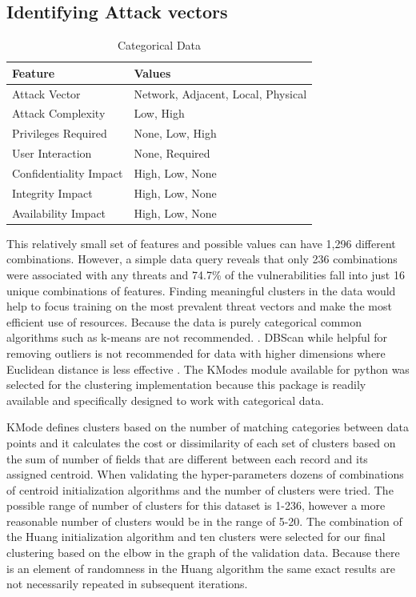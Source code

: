 \documentclass{article} %
\begin{document}
\subsection{Identifying Attack vectors}
\begin{table}[h!]
\begin{center}
\begin{tabular}{ |l|l| } \hline
Feature & Values\\\hline
Attack Vector & Network, Adjacent, Local, Physical  \\ 
Attack Complexity & Low, High  \\ 
Privileges Required & None, Low, High  \\ 
User Interaction & None, Required  \\ 
Confidentiality Impact & High, Low, None\\
Integrity Impact & High, Low, None\\
Availability Impact & High, Low, None\\
\hline
\end{tabular}
\end{center}
\caption{Categorical Data} 
\label{table:1}
\end{table} 

This relatively small set of features and possible values can have 1,296 different combinations.  However, a simple data query reveals that only 236 combinations were associated with any threats and 74.7\% of the vulnerabilities fall into just 16 unique combinations of features.  Finding meaningful clusters in the data would help to focus training on the most prevalent threat vectors and make the most efficient use of resources.  
Because the data is purely categorical common algorithms such as k-means are not recommended. \cite{Tan2019}.  DBScan while helpful for removing outliers is not recommended for data with higher dimensions where Euclidean distance is less effective \cite{Tan2019}.  The KModes module available for python was selected for the clustering implementation   because this package is readily available and specifically designed to work with categorical data.

KMode defines clusters based on the number of matching categories between data points and it calculates the cost or dissimilarity of each set of clusters based on the sum of number of fields that are different between each record and its assigned centroid.  When validating the hyper-parameters dozens of combinations of centroid initialization algorithms and the number of clusters were tried.  The possible range of number of clusters for this dataset is 1-236, however a more reasonable number of clusters would be in the range of 5-20.  The combination of the Huang initialization algorithm and ten clusters were selected for our final clustering based on the elbow in the graph of the validation data.  Because there is an element of randomness in the Huang algorithm the same exact results are not necessarily repeated in subsequent iterations.
\end{document}
